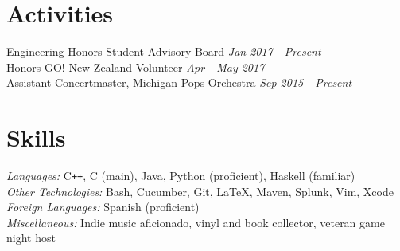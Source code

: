\documentclass[margin,line]{resume}
\begin{document}
\begin{resume}
	\sectionbreak
	\vspace{-2.5mm}
	\section{\mysidestyle Activities}
	\begin{flushright}
		\vspace{-7.5mm}
		Engineering Honors Student Advisory Board	\hfill  \textsl{Jan 2017 - Present} \\
		Honors GO! New Zealand Volunteer \hfill \textsl{Apr - May 2017} \\
		Assistant Concertmaster, Michigan Pops Orchestra  \hfill \textsl{Sep 2015 - Present}\\
	\end{flushright}
	\vspace{-1.5mm}
	    
	\sectionbreak
	\vspace{-2.5mm}
	\section{\mysidestyle Skills}
	\emph{Languages:} C\texttt{++}, C (main), Java, Python (proficient), Haskell (familiar) \\
	\emph{Other Technologies:} Bash, Cucumber, Git, \LaTeX, Maven, Splunk, Vim, Xcode \\
	\emph{Foreign Languages:} Spanish (proficient) \\
	\emph{Miscellaneous:}  Indie music aficionado, vinyl and book collector, veteran game night host
	
\end{resume}
\end{document}
